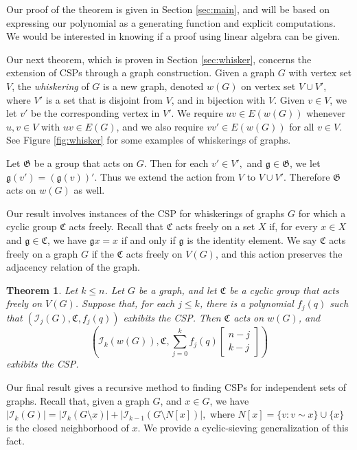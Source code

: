 \documentclass[12pt]{article}
\newtheorem{theorem}{Theorem}%
\theoremstyle{definition}
\newcommand{\gau}[2]{\left[ \begin{array}{c} #1 \\ #2 \end{array} \right]}
\begin{document}
Our proof of the theorem is given in Section \ref{sec:main}, and will be based on expressing our polynomial as a generating function and explicit computations. We would be interested in knowing if a proof using linear algebra can be given. 

Our next theorem, which is proven in Section \ref{sec:whisker}, concerns the extension of CSPs through a graph construction. Given a graph $G$ with vertex set $V$, the \emph{whiskering} of $G$ is a new graph, denoted $w(G)$ on vertex set $V \cup V'$, where $V'$ is a set that is disjoint from $V$, and in bijection with $V.$ Given $v \in V$, we let $v'$ be the corresponding vertex in $V'.$ We require $uv \in E(w(G))$ whenever $u,v \in V$ with $uv \in E(G)$, and we also require $vv' \in E(w(G))$ for all $v \in V.$ See Figure \ref{fig:whisker} for some examples of whiskerings of graphs.


Let $\mathfrak{G}$ be a group that acts on $G.$ Then for each $v' \in V',$ and $\mathfrak{g} \in \mathfrak{G}$, we let $\mathfrak{g}(v') = (\mathfrak{g}(v))'.$ Thus we extend the action from $V$ to $V \cup V'.$ Therefore $\mathfrak{G}$ acts on $w(G)$ as well.

Our result involves instances of the CSP for whiskerings of graphs $G$ for which a cyclic group $\mathfrak{C}$ acts freely. Recall that $\mathfrak{C}$ acts freely on a set $X$ if, for every $x \in X$ and $\mathfrak{g} \in \mathfrak{C}$, we have $\mathfrak{g}x = x$ if and only if $\mathfrak{g}$ is the identity element. We say $\mathfrak{C}$ acts freely on a graph $G$ if the $\mathfrak{C}$ acts freely on $V(G)$, and this action preserves the adjacency relation of the graph.

\begin{theorem}
Let $k \leq n$. Let $G$ be a graph, and let $\mathfrak{C}$ be a cyclic group that acts freely on $V(G)$. Suppose that, for each $j \leq k$, there is a polynomial $f_j(q)$ such that $(\mathcal{I}_j(G), \mathfrak{C}, f_j(q))$ exhibits the CSP. 
Then $\mathfrak{C}$ acts on $w(G)$, and \[\left(\mathcal{I}_k(w(G)), \mathfrak{C}, \sum_{j=0}^k f_j(q) \gau{n-j}{k-j}\right)\] exhibits the CSP.
\label{thm:whisker}
\end{theorem}

Our final result gives a recursive method to finding CSPs for independent sets of graphs.
 Recall that, given a graph $G$, and $x \in G$, we have $|\mathcal{I}_k(G)| = |\mathcal{I}_k(G \setminus x)| + |\mathcal{I}_{k-1}(G \setminus N[x])|,$ where $N[x] = \{v: v \sim x \} \cup \{x\}$ is the closed neighborhood of $x$. We provide a cyclic-sieving generalization of this fact.
\end{document}
